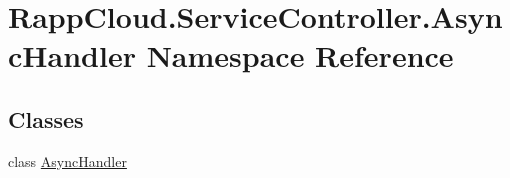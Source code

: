 \hypertarget{namespaceRappCloud_1_1ServiceController_1_1AsyncHandler}{\section{Rapp\-Cloud.\-Service\-Controller.\-Async\-Handler Namespace Reference}
\label{namespaceRappCloud_1_1ServiceController_1_1AsyncHandler}
}
\subsection*{Classes}
\begin{DoxyCompactItemize}
\item 
class \hyperlink{classRappCloud_1_1ServiceController_1_1AsyncHandler_1_1AsyncHandler}{Async\-Handler}
\end{DoxyCompactItemize}
